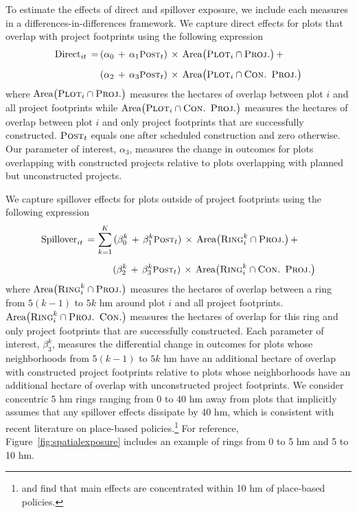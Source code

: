 \documentclass[12pt]{article}
\begin{document}
To estimate the effects of direct and spillover exposure, we include each measures in a differences-in-differences framework.  We capture direct effects for plots that overlap with project footprints using the following expression
\begin{align}
\begin{split}
\text{Direct}_{it} \,=\, &( \alpha_0 \, +  \, \alpha_1 \textsc{\small Post}_{t}) \, \times \, \text{Area}\big(\textsc{Plot}_i  \cap  \textsc{Proj.}\big) \, + \\[.5em]
&( \alpha_2 \, +  \, \alpha_3 \textsc{\small Post}_{t})  \, \times \, \text{Area}\big(\textsc{Plot}_i \cap \textsc{Con. Proj.}\big)
\end{split}
\end{align}
\noindent where $\text{Area}\big(\textsc{Plot}_i  \cap  \textsc{Proj.}\big)$ measures the hectares of overlap between plot $i$ and all project footprints while $\text{Area}\big(\textsc{Plot}_i \cap \textsc{Con. Proj.}\big)$ measures the hectares of overlap between plot $i$ and only project footprints that are successfully constructed.  $\textsc{Post}_{t}$ equals one after scheduled construction and zero otherwise.  Our parameter of interest, $\alpha_3$, measures the change in outcomes for plots overlapping with constructed projects relative to plots overlapping with planned but unconstructed projects.  

We capture spillover effects for plots outside of project footprints using the following expression
\begin{align}
\begin{split}
\text{Spillover}_{it} \,=\, &\sum_{k=1}^{K} \, (\beta_{0}^{k} \,+\, \beta_{1}^{k} \textsc{\small Post}_{t})  \, \times \, \text{Area}\big(\textsc{Ring}_i^{k}  \cap  \textsc{Proj.}\big) \, + \\[.5em]
&\hspace{1.7em}(\beta_{2}^{k} \,+\, \beta_{3}^{k} \textsc{\small Post}_{t})  \, \times \,\text{Area}\big(\textsc{Ring}_i^{k}  \cap \textsc{Con. Proj.}\big)
\end{split}
\end{align}
\noindent where $\text{Area}\big(\textsc{Ring}_i^{k}  \cap  \textsc{Proj.}\big)$ measures the  hectares of overlap between a ring from $5(k-1)$ to $5k$ hm around plot $i$ and all project footprints.   $\text{Area}\big(\textsc{Ring}_i^{k}  \cap  \textsc{Proj. Con.}\big)$ measures the hectares of overlap for this ring and only project footprints that are successfully constructed.  Each parameter of interest, $\beta_3^{k}$, measures the differential change in outcomes for plots whose neighborhoods from $5(k-1)$ to $5k$ hm have an additional hectare of overlap with constructed project footprints relative to plots whose neighborhoods have an additional hectare of overlap with unconstructed project footprints.  We consider concentric 5 hm rings ranging from 0 to 40 hm away from plots that implicitly assumes that any spillover effects dissipate by 40 hm, which is consistent with recent literature on place-based policies.\footnote{\cite{diamond2019wants} and \cite{rossi2010housing} find that main effects are concentrated within 10 hm of place-based policies.}   For reference, Figure~\ref{fig:spatialexposure} includes an example of rings from 0 to 5 hm and 5 to 10 hm.
\end{document}
